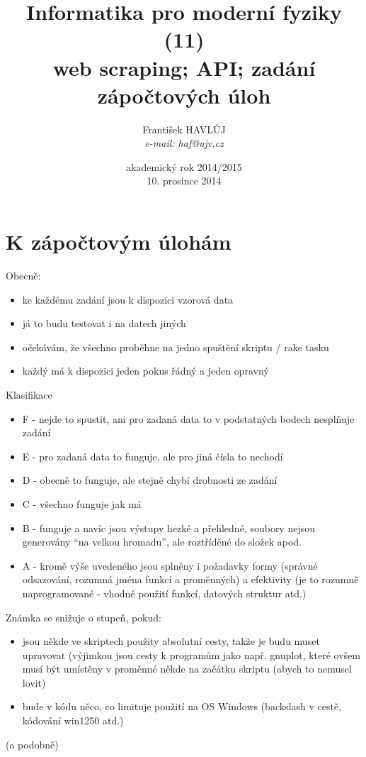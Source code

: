 \documentclass{beamer}
\title[IMF (11)]{Informatika pro moderní fyziky (11)\\ web scraping; API; zadání zápočtových úloh}
\author[Franti\v{s}ek HAVL\r{U}J, ORF ÚJV Řež]{Franti\v{s}ek HAVL\r{U}J\\{\scriptsize \emph{e-mail: haf@ujv.cz}}}
\date{akademický rok 2014/2015\\10. prosince 2014}
\institute[ORF ÚJV Řež]
{ÚJV Řež\\oddělení Reaktorové fyziky a podpory palivového cyklu}
\begin{document}
\begin{frame}
  \titlepage
\end{frame}

\begin{frame}
  \tableofcontents
\end{frame}

\section{K zápočtovým úlohám}

\begin{frame}{Obecně:}
\begin{itemize}
  \item ke každému zadání jsou k dispozici vzorová data
  \item já to budu testovat i na datech jiných
  \item očekávám, že všechno proběhne na jedno spuštění skriptu / rake tasku
  \item každý má k dispozici jeden pokus řádný a jeden opravný
\end{itemize}
\end{frame}

\begin{frame}{Klasifikace}
  \begin{itemize}
    \item F - nejde to spustit, ani pro zadaná data to v podstatných bodech nesplňuje zadání
    \item E - pro zadaná data to funguje, ale pro jiná čísla to nechodí
    \item D - obecně to funguje, ale stejně chybí drobnosti ze zadání
    \item C - všechno funguje jak má
    \item B - funguje a navíc jsou výstupy hezké a přehledné, soubory nejsou generovány “na velkou hromadu”, ale roztříděné do složek apod.
    \item A - kromě výše uvedeného jsou splněny i požadavky formy (správné odsazování, rozumná jména funkcí a proměnných) a efektivity (je to rozumně naprogramované - vhodné použití funkcí, datových struktur atd.)
  \end{itemize}
\end{frame}

\begin{frame}{Známka se snižuje o stupeň, pokud:}
  \begin{itemize}
    \item jsou někde ve skriptech použity absolutní cesty, takže je budu muset upravovat (výjimkou jsou cesty k programům jako např. gnuplot, které ovšem musí být umístěny v proměnné někde na začátku skriptu (abych to nemusel lovit)
    \item bude v kódu něco, co limituje použití na OS Windows (backslash v cestě, kódování win1250 atd.)
  \end{itemize}
  (a podobně)
\end{frame}
\end{document}
